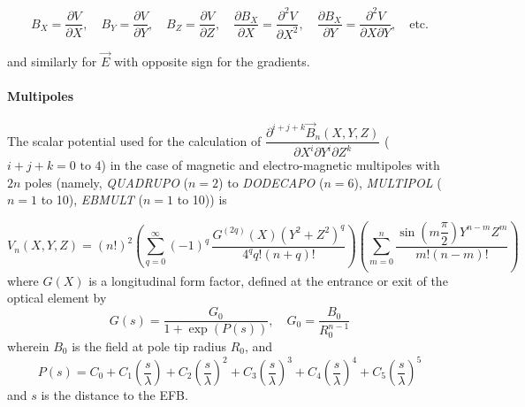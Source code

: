  \begin{equation}
	 	 B_X = \dfrac{\partial V}{\partial X}, 
	 	    \quad B_Y = \dfrac{\partial V }{ \partial Y}, 
	 	     \quad B_Z = \dfrac{\partial V }{ \partial Z}, 
	 	  \quad \dfrac{\partial B_X }{ \partial X} = \dfrac{\partial^2V}{\partial X^2},
	 	     \quad \dfrac{\partial B_X}{\partial Y} 
	 	               = \dfrac{\partial^2V}{\partial X\partial Y},
	 	    \quad\text{etc.}
 	\label{eq2-3-4}
 \end{equation}

\noindent  and similarly for $ \vec  E $ with opposite sign for the gradients. 


\paragraph{Multipoles}

\noindent The scalar potential used for the calculation of 
$ \dfrac{\partial^{i+j+k} \vec B_{n}(X,Y,Z)}{ \partial X^i\partial Y^i\partial 
Z^k}$ ($i+j+k= 0 \text{ to } 4$) in the case of 
 magnetic and electro-magnetic multipoles with $2n$ poles
(namely, \textsl{QUADRUPO} ($n = 2$) to  
\textsl{DODECAPO} ($n=6$),   
\textsl{MULTIPOL} ($n = 1$ to 10), 
\textsl{EBMULT} ($n=1$ to 10))   is~\cite{Biblio5}              %

\begin{equation}
	V_n(X,Y,Z)=(n!)^2 
	  \left( \sum^{ \infty}_{ q=0}(-1)^q \,
	        \dfrac{G^{(2q)}(X)(Y^2+Z^2)^q }{ 4^q q!(n+q)!} \right) 
	  \left( \sum^ n_{m=0}\dfrac{\sin \left(m \dfrac{\pi }{ 2} \right) Y^{n-m} Z^m }{ m!(n-m)!} \right) 
	\label{eq2-3-5}
\end{equation}
%
 where $ G(X) $ is a longitudinal form factor, defined at the entrance 
 or exit of the optical element by
 \begin{equation}
	 G(s) = \dfrac{G_0 }{ 1+ \exp(P(s))} , \quad G_0 = \dfrac{B_0 }{R^{n-1}_0} 
 	\label{eq2-3-6}
 \end{equation}
wherein $B_0$ is the field at pole tip radius $R_0$, and 
$$ P(s) = C_0
	       +C_1 \left(  \dfrac{s }{ \lambda} \right) 
	       +C_2 \left( \dfrac{s }{ \lambda} \right)^2 
	       + C_3 \left( \dfrac{s }{ \lambda} \right)^3 
	       +C_4 \left( \dfrac{s }{ \lambda} \right)^4 
	       + C_5 \left(\dfrac{s }{ \lambda} \right)^5 $$ 
and $s$ is the distance to the EFB.
 
